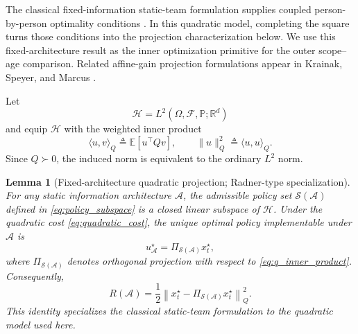 \documentclass[11pt]{article}
\newtheorem{lemma}{Lemma}
\begin{document}
The classical fixed-information static-team formulation supplies coupled
person-by-person optimality conditions \cite{radner1962team}. In this
quadratic model, completing the square turns those conditions into the
projection characterization below. We use this fixed-architecture result as the
inner optimization primitive for the outer scope--age comparison. Related
affine-gain projection formulations appear
in Krainak, Speyer, and Marcus \cite{krainak1982staticII}.

Let
\begin{equation}
    \mathcal{H}
    =
    L^2(
        \Omega,\mathcal{F},\mathbb{P};
        \mathbb{R}^{d}
    )
    \label{eq:hilbert_space}
\end{equation}
and equip $\mathcal{H}$ with the weighted inner product
\begin{equation}
    \langle u,v\rangle_Q
    \triangleq
    \mathbb{E}
    \left[
        u^\top Qv
    \right],
    \qquad
    \|u\|_Q^2
    \triangleq
    \langle u,u\rangle_Q.
    \label{eq:q_inner_product}
\end{equation}
Since $Q\succ0$, the induced norm is equivalent to the ordinary $L^2$ norm.

\begin{lemma}[Fixed-architecture quadratic projection; Radner-type specialization]
\label{lem:radner_projection}
For any static information architecture $\mathcal{A}$, the admissible policy set
$\mathcal{S}(\mathcal{A})$ defined in \eqref{eq:policy_subspace} is a closed
linear subspace of $\mathcal{H}$. Under the quadratic cost
\eqref{eq:quadratic_cost}, the unique optimal policy implementable under
$\mathcal{A}$ is
\begin{equation}
    u_{\mathcal{A}}^\star
    =
    \Pi_{\mathcal{S}(\mathcal{A})}
    x_t^\star,
    \label{eq:optimal_projection}
\end{equation}
where $\Pi_{\mathcal{S}(\mathcal{A})}$ denotes orthogonal projection with
respect to \eqref{eq:q_inner_product}. Consequently,
\begin{equation}
    \boxed{
    R(\mathcal{A})
    =
    \frac{1}{2}
    \left\|
        x_t^\star
        -
        \Pi_{\mathcal{S}(\mathcal{A})}
        x_t^\star
    \right\|_Q^2 .
    }
    \label{eq:projection_regret}
\end{equation}
This identity specializes the classical static-team formulation
\cite{radner1962team} to the quadratic model used here.
\end{lemma}
\end{document}
